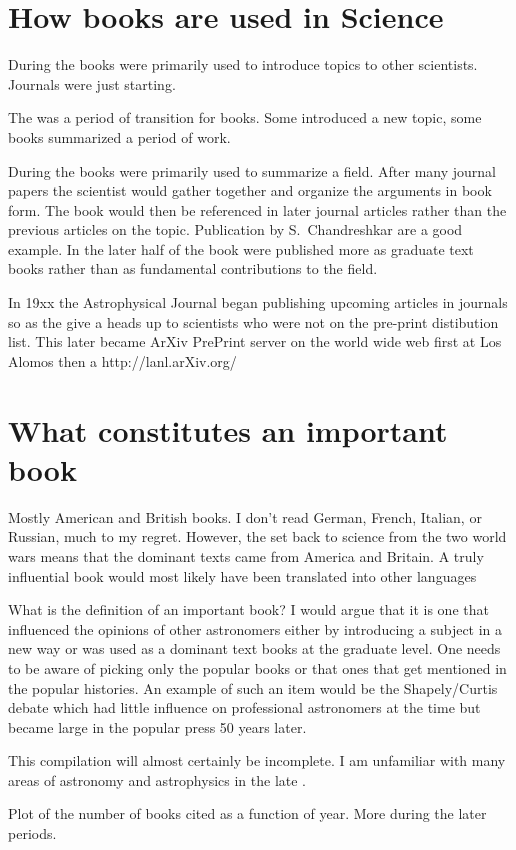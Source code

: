 \section{How books are used in Science}
During the  books were primarily used to introduce topics to
other scientists.  Journals were just starting.

The  was a period of transition for books. Some introduced a
new topic, some books summarized a period of work.

During the  books were primarily used to summarize a field.
After many journal papers the scientist would gather together and
organize the arguments in book form.  The book would then be
referenced in later journal articles rather than the previous articles
on the topic. Publication by S.\ Chandreshkar are a good example. In
the later half of the  book were published more as graduate
text books rather than as fundamental contributions to the field.

In 19xx the Astrophysical Journal began publishing upcoming articles
in journals so as the give a heads up to scientists who were not on
the pre-print distibution list.  This later became ArXiv PrePrint
server on the world wide web first at Los Alomos then a
http://lanl.arXiv.org/


\section{What constitutes an important book}

Mostly American and British books. I don't read German, French,
Italian, or Russian, much to my regret.  However, the set back to
science from the two world wars means that the dominant texts came
from America and Britain. A truly influential book would most likely
have been translated into other languages

What is the definition of an important book? I would argue that it is
one that influenced the opinions of other astronomers either by
introducing a subject in a new way or was used as a dominant text
books at the graduate level.  One needs to be aware of picking only
the popular books or that ones that get mentioned in the popular
histories.  An example of such an item would be the Shapely/Curtis
debate which had little influence on professional astronomers at the
time but became large in the popular press 50 years later.

This compilation will almost certainly be incomplete.  I am unfamiliar
with many areas of astronomy and astrophysics in the late .

Plot of the number of books cited as a function of year.  More during
the later periods.

